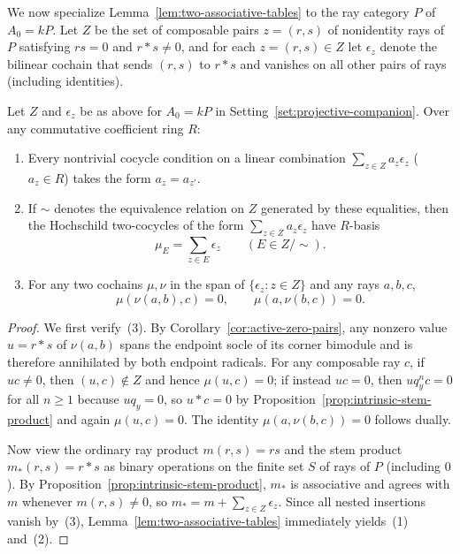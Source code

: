 We now specialize Lemma~\ref{lem:two-associative-tables} to the ray category $P$ of $A_0=kP$. Let $Z$ be the set of composable pairs $z=(r,s)$ of nonidentity rays of $P$ satisfying $rs=0$ and $r*s\ne0$, and for each $z=(r,s)\in Z$ let $\epsilon_z$ denote the bilinear cochain that sends $(r,s)$ to $r*s$ and vanishes on all other pairs of rays (including identities).

\begin{proposition}
\label{prop:indicator-cocycles}
Let $Z$ and $\epsilon_z$ be as above for $A_0=kP$ in Setting~\ref{set:projective-companion}. Over any commutative coefficient ring $R$:
\begin{enumerate}[label={\upshape(\arabic*)}]
\item Every nontrivial cocycle condition on a linear combination $\sum_{z\in Z}a_z\epsilon_z$ ($a_z\in R$) takes the form $a_z=a_{z'}$.
\item If $\sim$ denotes the equivalence relation on $Z$ generated by these equalities, then the Hochschild two-cocycles of the form $\sum_{z\in Z}a_z\epsilon_z$ have $R$-basis
\begin{equation}
  \mu_E=\sum_{z\in E}\epsilon_z\qquad(E\in Z/{\sim}).
  \label{eq:indicator-cocycles}
\end{equation}
\item For any two cochains $\mu,\nu$ in the span of $\{\epsilon_z:z\in Z\}$ and any rays $a,b,c$,
\begin{equation}
  \mu(\nu(a,b),c)=0,\qquad \mu(a,\nu(b,c))=0.
  \label{eq:mixed-insertions-zero}
\end{equation}
\end{enumerate}
\end{proposition}
\begin{proof}
We first verify~(3). By Corollary~\ref{cor:active-zero-pairs}, any nonzero value $u=r*s$ of $\nu(a,b)$ spans the endpoint socle of its corner bimodule and is therefore annihilated by both endpoint radicals. For any composable ray $c$, if $uc\ne0$, then $(u,c)\notin Z$ and hence $\mu(u,c)=0$; if instead $uc=0$, then $uq_y^nc=0$ for all $n\geq1$ because $uq_y=0$, so $u*c=0$ by Proposition~\ref{prop:intrinsic-stem-product} and again $\mu(u,c)=0$. The identity $\mu(a,\nu(b,c))=0$ follows dually.

Now view the ordinary ray product $m(r,s)=rs$ and the stem product $m_*(r,s)=r*s$ as binary operations on the finite set $S$ of rays of $P$ (including $0$). By Proposition~\ref{prop:intrinsic-stem-product}, $m_*$ is associative and agrees with $m$ whenever $m(r,s)\ne0$, so $m_*=m+\sum_{z\in Z}\epsilon_z$. Since all nested insertions vanish by~(3), Lemma~\ref{lem:two-associative-tables} immediately yields~(1) and~(2).
\end{proof}

